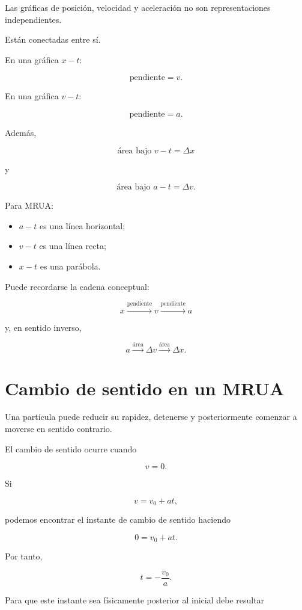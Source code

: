 Las gráficas de posición, velocidad y aceleración no son representaciones
independientes.

Están conectadas entre sí.

En una gráfica \(x-t\):

\[ \boxed{\text{pendiente}=v}. \]

En una gráfica \(v-t\):

\[ \boxed{\text{pendiente}=a}. \]

Además,

\[
\boxed{
\text{área bajo }v-t
=
\Delta x
}
\]

y

\[
\boxed{
\text{área bajo }a-t
=
\Delta v
}.
\]

Para MRUA:

\begin{itemize}
    \item \(a-t\) es una línea horizontal;
    \item \(v-t\) es una línea recta;
    \item \(x-t\) es una parábola.
\end{itemize}

\begin{idea}
Puede recordarse la cadena conceptual:

\[
x
\xrightarrow{\text{pendiente}}
v
\xrightarrow{\text{pendiente}}
a
\]

y, en sentido inverso,

\[
a
\xrightarrow{\text{área}}
\Delta v
\xrightarrow{\text{área}}
\Delta x.
\]
\end{idea}


\section{Cambio de sentido en un MRUA}

Una partícula puede reducir su rapidez, detenerse y posteriormente comenzar
a moverse en sentido contrario.

El cambio de sentido ocurre cuando

\[ v=0. \]

Si

\[ v=v_0+at, \]

podemos encontrar el instante de cambio de sentido haciendo

\[ 0=v_0+at. \]

Por tanto,

\[ \boxed{t=-\frac{v_0}{a}}. \]

Para que este instante sea físicamente posterior al inicial debe resultar

